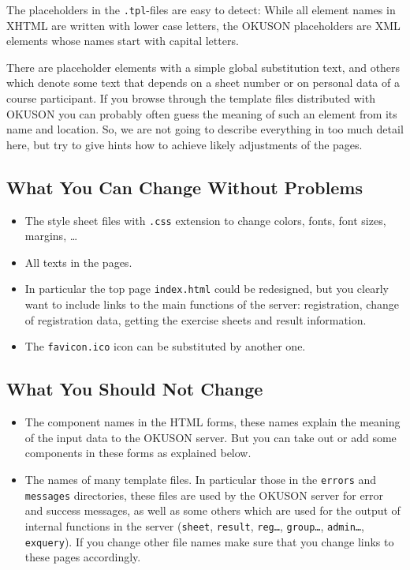 \documentclass[12pt,openany,a4paper]{book}
\newcommand{\OKUSON}{\textsf{OKUSON}}
\begin{document}
The placeholders in  the \texttt{.tpl}-files are easy to detect: While all
element names in XHTML are written with lower case letters, the 
{\OKUSON} placeholders are XML elements whose names start with  capital
letters.

There are placeholder elements with a simple global substitution text, and
others which denote some text that depends on a sheet number or on personal
data of a course participant. If you browse through the template files
distributed with {\OKUSON} you can probably often guess the meaning of such
an element from its name and location. So, we are not going to describe
everything in too much detail here, but try to give hints how to achieve likely
adjustments of the pages.

\subsection{What You Can Change Without Problems}

\begin{itemize}
\item The style sheet files with \texttt{.css} extension to change colors,
fonts, font sizes, margins, \ldots
\item All texts in the pages.
\item In particular the top page \texttt{index.html} could be 
redesigned, but you clearly want to include  links to the main functions of
the server: registration, change of registration data, getting the exercise
sheets and result information.
\item The \texttt{favicon.ico} icon can be substituted by another one.
\end{itemize}

\subsection{What You Should Not Change}

\begin{itemize}
\item The component names in the HTML forms, these names explain the meaning
of the input data to the {\OKUSON} server. But you can take out or add some
components in these forms as explained below.
\item The names of many template files. In particular those in the
\texttt{errors} and \texttt{messages} directories, these files are used by
the {\OKUSON} server for error and success messages, as well as some others
which are used for the output of  internal functions in the server
(\texttt{sheet}, \texttt{result}, \texttt{reg\ldots}, \texttt{group\ldots},
\texttt{admin\ldots}, \texttt{exquery}).
If you change other file names make sure that you change links to these 
pages accordingly.
\end{itemize}
\end{document}
